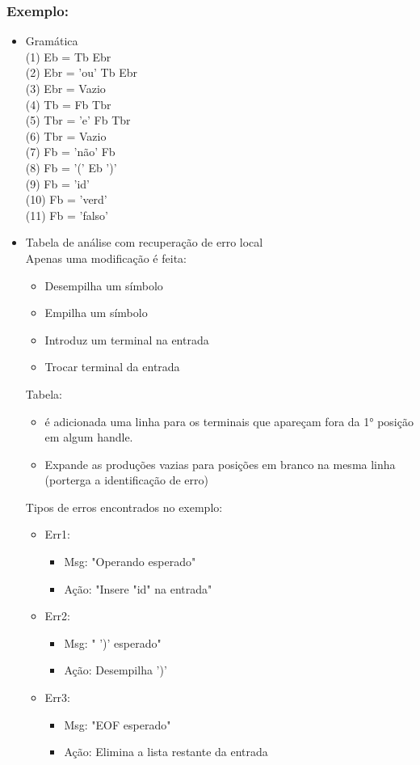 \documentclass[11pt]{article}
\begin{document}
\subsubsection{Exemplo:}
\label{sec:orga4f6518}
\begin{itemize}
\item Gramática\\
(1) Eb = Tb Ebr\\
(2) Ebr = 'ou' Tb Ebr\\
(3) Ebr = Vazio\\
(4) Tb = Fb Tbr\\
(5) Tbr = 'e' Fb Tbr\\
(6) Tbr = Vazio\\
(7) Fb = 'não' Fb\\
(8) Fb = '(' Eb ')'\\
(9) Fb = 'id'\\
(10) Fb = 'verd'\\
(11) Fb = 'falso'\\

\item Tabela de análise com recuperação de erro local\\

Apenas uma modificação é feita:
\begin{itemize}
\item Desempilha um símbolo
\item Empilha um símbolo
\item Introduz um terminal na entrada
\item Trocar terminal da entrada\\
\end{itemize}

Tabela:
\begin{itemize}
\item é adicionada uma linha para os terminais que apareçam 
fora da 1° posição em algum handle.
\item Expande as produções vazias para posições em branco na mesma
linha (porterga a identificação de erro)\\
\end{itemize}

Tipos de erros encontrados no exemplo:
\begin{itemize}
\item Err1:
\begin{itemize}
\item Msg: "Operando esperado"
\item Ação: "Insere "id" na entrada"
\end{itemize}
\item Err2:
\begin{itemize}
\item Msg: " ')' esperado"
\item Ação: Desempilha ')'
\end{itemize}
\item Err3:
\begin{itemize}
\item Msg: "EOF esperado"
\item Ação: Elimina a lista restante da entrada
\end{itemize}
\end{itemize}
\end{itemize}
\end{document}

